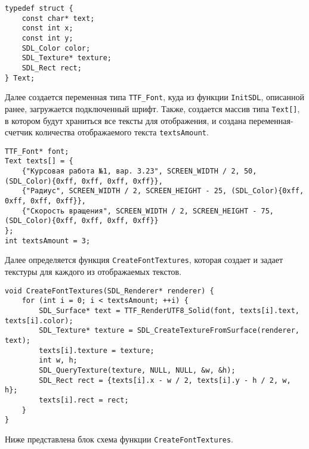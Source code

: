\documentclass[14pt]{extarticle}
\begin{document}
{    \begin{lstlisting}
typedef struct {
	const char* text;
	const int x;
	const int y;
	SDL_Color color;
	SDL_Texture* texture;
	SDL_Rect rect;
} Text;\end{lstlisting}

    \begin{spacing}{1.5}
        Далее создается переменная типа \verb|TTF_Font|, куда из функции \verb|InitSDL|, описанной ранее, загружается подключенный шрифт. Также, создается массив типа \verb|Text[]|, в котором будут храниться все тексты для отображения, и создана переменная-счетчик количества отображаемого текста \verb|textsAmount|.
    \end{spacing}

    \begin{lstlisting}
TTF_Font* font;
Text texts[] = {
	{"Курсовая работа №1, вар. 3.23", SCREEN_WIDTH / 2, 50, (SDL_Color){0xff, 0xff, 0xff, 0xff}},
	{"Радиус", SCREEN_WIDTH / 2, SCREEN_HEIGHT - 25, (SDL_Color){0xff, 0xff, 0xff, 0xff}},
	{"Скорость вращения", SCREEN_WIDTH / 2, SCREEN_HEIGHT - 75, (SDL_Color){0xff, 0xff, 0xff, 0xff}}
};
int textsAmount = 3;\end{lstlisting}

    \label{sec:createfonts}
    \begin{spacing}{1.5}
        Далее определяется функция \verb|CreateFontTextures|, которая создает и задает текстуры для каждого из отображаемых текстов.
    \end{spacing}
    \begin{lstlisting}
void CreateFontTextures(SDL_Renderer* renderer) {
	for (int i = 0; i < textsAmount; ++i) {
		SDL_Surface* text = TTF_RenderUTF8_Solid(font, texts[i].text, texts[i].color);
		SDL_Texture* texture = SDL_CreateTextureFromSurface(renderer, text);
		texts[i].texture = texture;
		int w, h;
		SDL_QueryTexture(texture, NULL, NULL, &w, &h);
		SDL_Rect rect = {texts[i].x - w / 2, texts[i].y - h / 2, w, h};
		texts[i].rect = rect;
	}
}\end{lstlisting}

    \begin{spacing}{1.5}
        \noindent
        Ниже представлена блок схема функции \verb|CreateFontTextures|.
    \end{spacing}

    \vspace{-0.5em}

}
\end{document}
